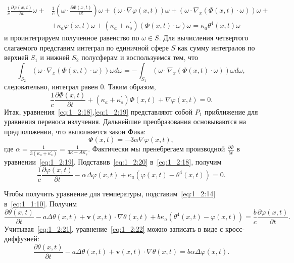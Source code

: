 \[
    \begin{aligned}
        \frac{1}{c} \frac{\partial \varphi(x, t)}{\partial t} \omega+&
        \frac{1}{c}\left(\omega \cdot \frac{\partial \Phi(x, t)}{\partial t}\right)
        \omega+(\omega \cdot \nabla \varphi(x, t)) \omega
        +\left(\omega \cdot \nabla_{x}(\Phi(x, t)
        \cdot \omega)\right) \omega+\\
        &+\kappa_{a} \varphi(x, t) \omega+\left(\kappa_{a}
        +\kappa_{s}^{\prime}\right)(\Phi(x, t)
        \cdot \omega) \omega=\kappa_{a} \theta^{4}(x, t) \omega
    \end{aligned}
\]
и проинтегрируем полученное равенство по $\omega \in S$.
Для вычисления четвертого слагаемого представим интеграл по единичной сфере $S$
как сумму интегралов по верхней $S_{1}$ и нижней $S_{2}$ полусферам и воспользуемся тем, что
\[
    \int_{S_{2}}\left(\omega \cdot \nabla_{x}(\Phi(x, t)
    \cdot \omega)\right) \omega d
    \omega=-\int_{S_{1}}\left(\omega \cdot \nabla_{x}(\Phi(x, t)
    \cdot \omega)\right) \omega d \omega,
\]
следовательно, интеграл равен 0.
Таким образом,
\begin{equation}
    \label{eq:1_2:19}
    \frac{1}{c} \frac{\partial \Phi(x, t)}{\partial t}
    + \left(\kappa_{a}+\kappa_{s}^{\prime}\right)
    \Phi(x, t)+\nabla \varphi(x, t)=0.
\end{equation}
Итак, уравнения~\eqref{eq:1_2:18},\eqref{eq:1_2:19}
представляют собой $P_{1}$ приближение
для уравнения переноса излучения.
Дальнейшие преобразования основываются на предположении, что выполняется закон Фика:
\begin{equation}
    \label{eq:1_2:20}
    \Phi(x, t)=-3 \alpha \nabla \varphi(x, t),
\end{equation}
где $\alpha=\frac{1}{3\left(\kappa_{a}+\kappa_{s}^{\prime}\right)}
=\frac{1}{3 \kappa-A \kappa_{s}}$.
Фактически мы пренебрегаем производной
$\frac{\partial \Phi}{\partial t}$ в уравнении~\eqref{eq:1_2:19}.
Подставив~\eqref{eq:1_2:20} в~\eqref{eq:1_2:18}, получим
\begin{equation}
    \label{eq:1_2:21}
    \frac{1}{c} \frac{\partial \varphi(x, t)}{\partial t}-\alpha \Delta
    \varphi(x, t)+\kappa_{a}\left(\varphi(x, t)-\theta^{4}(x, t)\right)=0.
\end{equation}

Чтобы получить уравнение для температуры, подставим~\eqref{eq:1_2:14} в~\eqref{eq:1_1:10}.
Получим
\begin{equation}
    \label{eq:1_2:22}
    \frac{\partial \theta(x, t)}{\partial t}-a \Delta \theta(x, t)+\mathbf{v}(x, t) \cdot
    \nabla \theta(x, t)+b \kappa_{a}\left(\theta^{4}(x, t)-\varphi(x, t)\right)=\frac{b}{c}
    \frac{\partial \varphi(x, t)}{\partial t}.
\end{equation}
Учитывая~\eqref{eq:1_2:21}, уравнение~\eqref{eq:1_2:22} можно записать в виде с кросс-диффузией:
\[
    \frac{\partial \theta(x, t)}{\partial t}-a \Delta \theta(x, t)+\mathbf{v}(x, t) \cdot
    \nabla \theta(x, t)=b \alpha \Delta \varphi(x, t).
\]

